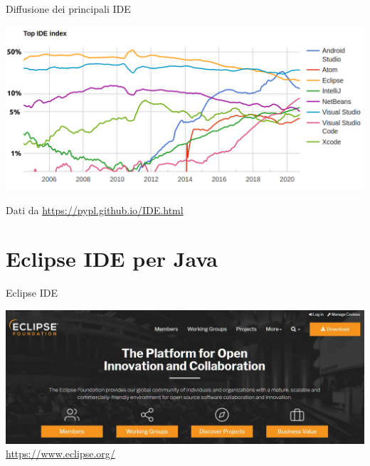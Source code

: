 \documentclass[xcolor=dvipsnames,presentation]{beamer}
\begin{document}
\begin{frame}{Diffusione dei principali IDE}
	\begin{center}
		\includegraphics[width=\textwidth]{img/ide2020.png}
	\end{center}
	\centering
	Dati da \url{https://pypl.github.io/IDE.html}
\end{frame}

\section{Eclipse IDE per Java}

\begin{frame}{Eclipse IDE}
\begin{center}
\includegraphics[width=\textwidth]{img/eclipse-web-site.png}
\url{https://www.eclipse.org/}
\end{center}
\end{frame}
\end{document}

